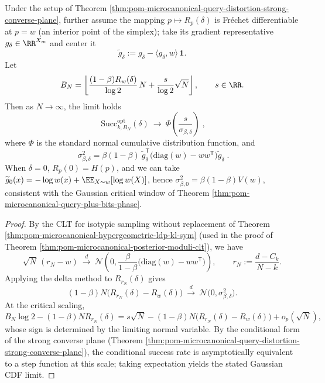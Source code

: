 \begin{theorem}\label{thm:pom-microcanonical-query-distortion-critical-window-clt}
Under the setup of Theorem \ref{thm:pom-microcanonical-query-distortion-strong-converse-plane},
further assume the mapping \(p\mapsto R_p(\delta)\) is Fr\'echet differentiable at \(p=w\) (an interior point of the simplex);
take its gradient representative \(g_\delta\in\RR^{X_m}\) and center it
\[
\widetilde g_\delta:=g_\delta-\langle g_\delta,w\rangle\,\mathbf 1.
\]
Let
\[
B_N=\left\lfloor \frac{(1-\beta)R_w(\delta)}{\log 2}\,N+\frac{s}{\log 2}\sqrt N\right\rfloor,\qquad s\in\RR.
\]
Then as \(N\to\infty\), the limit holds
\[
\boxed{\;
\mathrm{Succ}^{\mathrm{opt}}_{k,B_N}(\delta)\ \longrightarrow\ \Phi\!\left(\frac{s}{\sigma_{\beta,\delta}}\right)\; } ,
\]
where \(\Phi\) is the standard normal cumulative distribution function, and
\[
\boxed{\;
\sigma_{\beta,\delta}^2
=\beta(1-\beta)\ \widetilde g_\delta^{\mathsf T}\bigl(\mathrm{diag}(w)-ww^{\mathsf T}\bigr)\widetilde g_\delta\; } .
\]
When \(\delta=0\), \(R_p(0)=H(p)\), and we can take \(\widetilde g_0(x)=-\log w(x)+\EE_{X\sim w}[\log w(X)]\), hence \(\sigma_{\beta,0}^2=\beta(1-\beta)V(w)\), consistent with the Gaussian critical window of Theorem \ref{thm:pom-microcanonical-query-plus-bits-phase}.
\end{theorem}
\begin{proof}
By the CLT for isotypic sampling without replacement of Theorem \ref{thm:pom-microcanonical-hypergeometric-ldp-kl-sym} (used in the proof of Theorem \ref{thm:pom-microcanonical-posterior-moduli-clt}), we have
\[
\sqrt N\,(r_N-w)\ \xrightarrow{d}\ \mathcal N\!\left(0,\frac{\beta}{1-\beta}\bigl(\mathrm{diag}(w)-ww^{\mathsf T}\bigr)\right),
\qquad r_N:=\frac{d-C_k}{N-k}.
\]
Applying the delta method to \(R_{r_N}(\delta)\) gives
\[
(1-\beta)N\bigl(R_{r_N}(\delta)-R_w(\delta)\bigr)
\ \xrightarrow{d}\ \mathcal N\bigl(0,\sigma_{\beta,\delta}^2\bigr).
\]
At the critical scaling,
\[
B_N\log 2-(1-\beta)N R_{r_N}(\delta)=s\sqrt N-(1-\beta)N\bigl(R_{r_N}(\delta)-R_w(\delta)\bigr)+o_p(\sqrt N),
\]
whose sign is determined by the limiting normal variable.
By the conditional form of the strong converse plane (Theorem \ref{thm:pom-microcanonical-query-distortion-strong-converse-plane}), the conditional success rate is asymptotically equivalent to a step function at this scale;
taking expectation yields the stated Gaussian CDF limit.
\end{proof}

